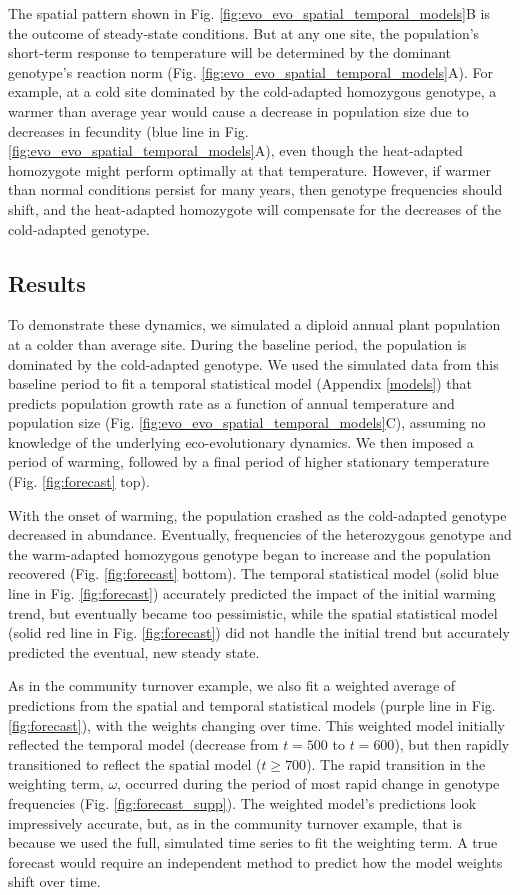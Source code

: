 \documentclass[11pt]{article}
\begin{document}
The spatial pattern shown in Fig. \ref{fig:evo_evo_spatial_temporal_models}B is the outcome of steady-state conditions. But at any one site, the population's short-term response to temperature will be determined by the dominant genotype's reaction norm (Fig. \ref{fig:evo_evo_spatial_temporal_models}A). For example, at a cold site dominated by the cold-adapted homozygous genotype, a warmer than average year would cause a decrease in population size due to decreases in fecundity (blue line in Fig. \ref{fig:evo_evo_spatial_temporal_models}A), even though the heat-adapted homozygote might perform optimally at that temperature. However, if warmer than normal conditions persist for many years, then genotype frequencies should shift, and the heat-adapted homozygote will compensate for the decreases of the cold-adapted genotype. 

\subsection*{Results}

To demonstrate these dynamics, we simulated a diploid annual plant population at a colder than average site. During the baseline period, the population is dominated by the cold-adapted genotype. We used the simulated data from this baseline period to fit a temporal statistical model (Appendix \ref{models}) that predicts population growth rate as a function of annual temperature and population size (Fig. \ref{fig:evo_evo_spatial_temporal_models}C), assuming no knowledge of the underlying eco-evolutionary dynamics. We then imposed a period of warming, followed by a final period of higher stationary temperature (Fig. \ref{fig:forecast} top).

With the onset of warming, the population crashed as the cold-adapted genotype decreased in abundance. Eventually, frequencies of the heterozygous genotype and the warm-adapted homozygous genotype began to increase and the population recovered (Fig. \ref{fig:forecast} bottom). The temporal statistical model (solid blue line in Fig. \ref{fig:forecast}) accurately predicted the impact of the initial warming trend, but eventually became too pessimistic, while the spatial statistical model (solid red line in Fig. \ref{fig:forecast}) did not handle the initial trend but accurately predicted the eventual, new steady state.

As in the community turnover example, we also fit a weighted average of predictions from the spatial and temporal statistical models (purple line in Fig. \ref{fig:forecast}), with the weights changing over time. This weighted model initially reflected the temporal model (decrease from $t=500$ to $t=600$), but then rapidly transitioned to reflect the spatial model ($t \geq 700$). The rapid transition in the weighting term, $\omega$, occurred during the period of most rapid change in genotype frequencies (Fig. \ref{fig:forecast_supp}). The weighted model's predictions look impressively accurate, but, as in the community turnover example, that is because we used the full, simulated time series to fit the weighting term. A true forecast would require an independent method to predict how the model weights shift over time.
\end{document}
